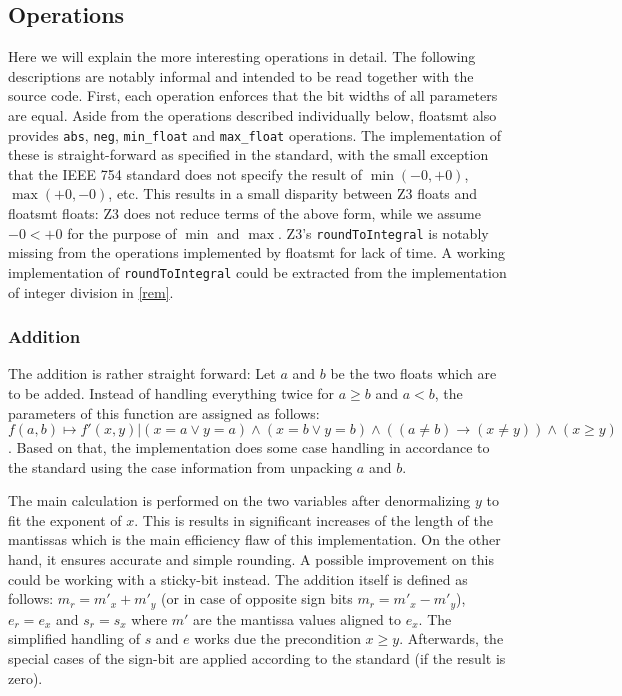 \documentclass[a4paper,UKenglish,cleveref, autoref, thm-restate]{lipics-v2019}
\begin{document}
\subsection{Operations}
Here we will explain the more interesting operations in detail. The following descriptions are notably informal and intended to be read together with the source code. First, each operation enforces that the bit widths of all parameters are equal. Aside from the operations described individually below, floatsmt also provides \verb|abs|, \verb|neg|, \verb|min_float| and \verb|max_float| operations. The implementation of these is straight-forward as specified in the standard, with the small exception that the IEEE 754 standard does not specify the result of $\min(-0, +0)$, $\max(+0, -0)$, etc. This results in a small disparity between Z3 floats and floatsmt floats: Z3 does not reduce terms of the above form, while we assume $-0 < +0$ for the purpose of $\min$ and $\max$. Z3's \verb|roundToIntegral| is notably missing from the operations implemented by floatsmt for lack of time. A working implementation of \verb|roundToIntegral| could be extracted from the implementation of integer division in \cref{rem}.

\subsubsection{Addition}
The addition is rather straight forward: Let $a$ and $b$ be the two floats which are to be added. Instead of handling everything twice for $a\geq b$ and $a<b$, the parameters of this function are assigned as follows: $f(a, b) \mapsto f'(x, y) | (x = a \vee y = a) \wedge (x = b \vee y = b) \wedge ((a \neq b) \rightarrow (x \neq y)) \wedge (x \geq y)$. Based on that, the implementation does some case handling in accordance to the standard using the case information from unpacking $a$ and $b$.

The main calculation is performed on the two variables after denormalizing $y$ to fit the exponent of $x$. This is results in significant increases of the length of the mantissas which is the main efficiency flaw of this implementation. On the other hand, it ensures accurate and simple rounding. A possible improvement on this could be working with a sticky-bit instead. The addition itself is defined as follows: $m_r = m'_x + m'_y$ (or in case of opposite sign bits $m_r = m'_x - m'_y$), $e_r = e_x$ and $s_r = s_x$ where $m'$ are the mantissa values aligned to $e_x$. The simplified handling of $s$ and $e$ works due the 
precondition $x \geq y$. Afterwards, the special cases of the sign-bit are applied according to the standard (if the result is zero).
\end{document}
